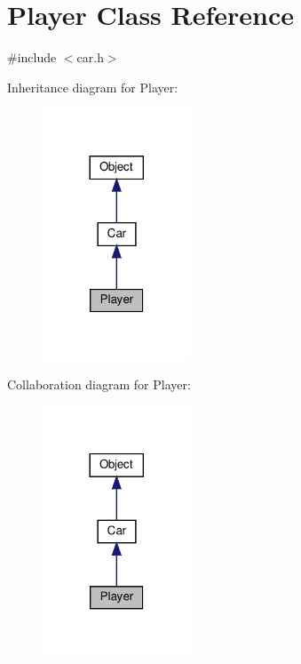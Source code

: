 \hypertarget{classPlayer}{}\section{Player Class Reference}
\label{classPlayer}


{\ttfamily \#include $<$car.\+h$>$}



Inheritance diagram for Player\+:\nopagebreak
\begin{figure}[H]
\begin{center}
\leavevmode
\includegraphics[width=125pt]{classPlayer__inherit__graph}
\end{center}
\end{figure}


Collaboration diagram for Player\+:\nopagebreak
\begin{figure}[H]
\begin{center}
\leavevmode
\includegraphics[width=125pt]{classPlayer__coll__graph}
\end{center}
\end{figure}
